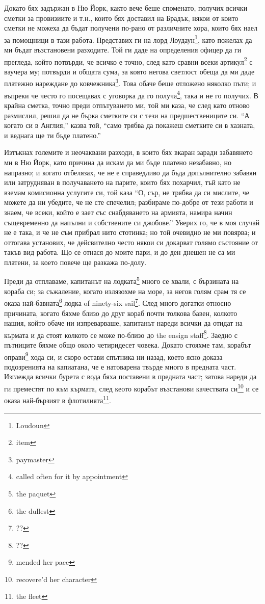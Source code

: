 \documentclass[12pt]{book}
\begin{document}
Докато бях задържан в Ню Йорк, както вече беше споменато, получих всички сметки за провизиите и т.н., които бях доставил на Брадък, някои от които сметки не можеха да бъдат получени по-рано от различните хора, които бях наел за помощници в тази работа. Представих ги на лорд Лоудаун\footnote{Loudoun}, като пожелах да ми бъдат възстановени разходите. Той ги даде на определения офицер да ги прегледа, който потвърди, че всичко е точно, след като сравни всеки артикул\footnote{item} с ваучера му; потвърди и общата сума, за която негова светлост обеща да ми даде платежно нареждане до ковчежника\footnote{paymaster}. Това обаче беше отложено няколко пъти;  и въпреки че често го посещавах с уговорка да го получа\footnote{called often for it by appointment}, така и не го получих. В крайна сметка, точно преди отпътуването ми, той ми каза, че след като отново размислил, решил да не бърка сметките си с тези на предшествениците си. “А когато си в Англия,” казва той, “само трябва да покажеш сметките си в хазната, и веднага ще ти бъде платено.”

Изтъкнах големите и неочаквани разходи, в които бях вкаран заради забавянето ми в Ню Йорк, като причина да искам да ми бъде платено незабавно, но напразно; и когато отбелязах, че не е справедливо да бъда допълнително забавян или затрудняван в получаването на парите, които бях похарчил, тъй като не вземам комисионна услугите си, той каза “О, сър, не трябва да си мислите, че можете да ни убедите, че не сте спечелил; разбираме по-добре от тези работи и знаем, че всеки, който е зает със снабдяването на армията, намира начин същевременно да напълни и собствените си джобове.” Уверих го, че в моя случай не е така, и че не съм прибрал нито стотинка; но той очевидно не ми повярва; и оттогава установих, че дейсвително често някои си докарват голямо състояние от такъв вид работа. Що се отнася до моите пари, и до ден днешен не са ми платени, за което повече ще разкажа по-долу.

Преди да отплаваме, капитанът на лодката\footnote{the paquet} много се хвали, с бързината на кораба си; за съжаление, когато излязохме на море, за негов голям срам тя се оказа най-бавната\footnote{the dullest} лодка of ninety-six sail\footnote{??}. След много догатки относно причината, когато бяхме близо до друг кораб почти толкова бавен, колкото нашия, който обаче ни изпреварваше, капитанът нареди всички да отидат на кърмата и да стоят колкото се може по-близо до the ensign staff\footnote{??}. Заедно с пътниците бяхме общо около четиридесет човека. Докато стояхме там, корабът оправи\footnote{mended her pace} хода си, и скоро остави спътника ни назад, което ясно доказа подозренията на капиатана, че е натоварена твърде много в предната част. Изглежда всички бурета с вода бяха поставени в предната част; затова нареди да ги преместят по към кърмата, след кеото корабът възстанови качествата си\footnote{recovere'd her character} и се оказа най-бързият в флотилията\footnote{the fleet}. 
\end{document}
